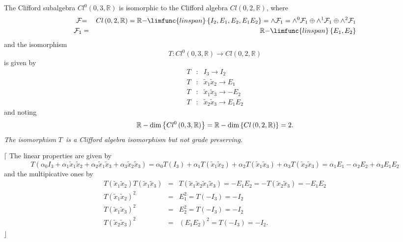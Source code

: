 \documentclass[aps,preprint]{revtex4}
\begin{document}
The Clifford subalgebra $Cl^{0}\left( 0,3,\mathbb{R}\right) $ is isomorphic
to the Clifford algebra $Cl\left( 0,2,\mathbb{R}\right) $, where 
\begin{eqnarray}
\mathcal{F} &\mathcal{=}&Cl\left( 0,2,\mathbb{R}\right) =\mathbb{R-}\limfunc{%
linspan}\left\{ I_{2},E_{1},E_{2},E_{1}E_{2}\right\} =\wedge \mathcal{F}%
_{1}=\wedge ^{0}\mathcal{F}_{1}\oplus \wedge ^{1}\mathcal{F}_{1}\oplus
\wedge ^{2}\mathcal{F}_{1} \\
\mathcal{F}_{1} &=&\mathbb{R-}\limfunc{linspan}\left\{ E_{1},E_{2}\right\}
\end{eqnarray}%
and the isomorphism 
\begin{equation}
T:Cl^{0}\left( 0,3,\mathbb{R}\right) \rightarrow Cl\left( 0,2,\mathbb{R}%
\right)
\end{equation}%
is given by 
\begin{eqnarray}
T &:&I_{3}\rightarrow I_{2} \\
T &:&\widetilde{x}_{1}\widetilde{x}_{2}\rightarrow E_{1} \\
T &:&\widetilde{x}_{1}\widetilde{x}_{3}\rightarrow -E_{2} \\
T &:&\widetilde{x}_{2}\widetilde{x}_{3}\rightarrow E_{1}E_{2}
\end{eqnarray}%
and noting 
\begin{equation}
\mathbb{R}-\dim \left\{ Cl^{0}\left( 0,3,\mathbb{R}\right) \right\} =\mathbb{%
R}-\dim \left\{ Cl\left( 0,2,\mathbb{R}\right) \right\} =2.
\end{equation}%
\emph{The isomorphism }$T$\emph{\ is a Clifford algebra isomorphism but not
grade preserving.}

$\lceil $ The linear properties are given by 
\begin{equation}
T\left( \alpha _{0}I_{3}+\alpha _{1}\widetilde{x}_{1}\widetilde{x}%
_{2}+\alpha _{2}\widetilde{x}_{1}\widetilde{x}_{3}+\alpha _{3}\widetilde{x}%
_{2}\widetilde{x}_{3}\right) =\alpha _{0}T\left( I_{3}\right) +\alpha
_{1}T\left( \widetilde{x}_{1}\widetilde{x}_{2}\right) +\alpha _{2}T\left( 
\widetilde{x}_{1}\widetilde{x}_{3}\right) +\alpha _{3}T\left( \widetilde{x}%
_{2}\widetilde{x}_{3}\right) =\alpha _{1}E_{1}-\alpha _{2}E_{2}+\alpha
_{3}E_{1}E_{2}
\end{equation}%
and the multipicative ones by 
\begin{eqnarray}
T\left( \widetilde{x}_{1}\widetilde{x}_{2}\right) T\left( \widetilde{x}_{1}%
\widetilde{x}_{3}\right) &=&T\left( \widetilde{x}_{1}\widetilde{x}_{2}%
\widetilde{x}_{1}\widetilde{x}_{3}\right) =-E_{1}E_{2}=-T\left( \widetilde{x}%
_{2}\widetilde{x}_{3}\right) =-E_{1}E_{2} \\
T\left( \widetilde{x}_{1}\widetilde{x}_{2}\right) ^{2} &=&E_{1}^{2}=T\left(
-I_{3}\right) =-I_{2} \\
T\left( \widetilde{x}_{1}\widetilde{x}_{3}\right) ^{2} &=&E_{2}^{2}=T\left(
-I_{3}\right) =-I_{2} \\
T\left( \widetilde{x}_{2}\widetilde{x}_{3}\right) ^{2} &=&\left(
E_{1}E_{2}\right) ^{2}=T\left( -I_{3}\right) =-I_{2}.
\end{eqnarray}%
$\rfloor $
\end{document}
